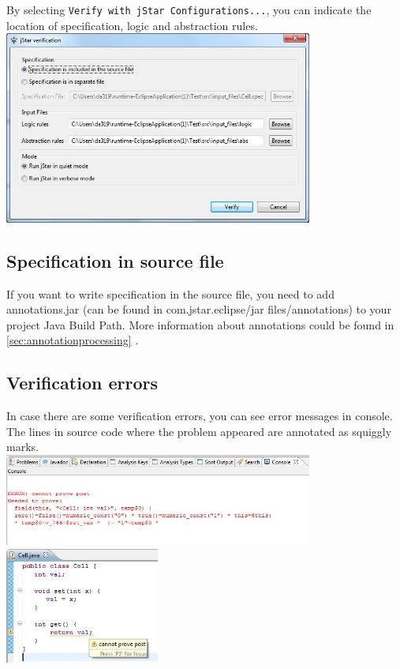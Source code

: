 \documentclass{article}
\begin{document}
By selecting \texttt{Verify with jStar Configurations...}, you can indicate the location of specification, logic and abstraction rules.\\

\includegraphics[width=4in]{images/verificationWindow.jpg}

\subsection*{Specification in source file}

If you want to write specification in the source file, you need to add annotations.jar (can be found in com.jstar.eclipse/jar files/annotations) to your project Java Build Path. More information about annotations could be found in \ref{sec:annotationprocessing} .

\subsection* {Verification errors}

In case there are some verification errors, you can see error messages in console. The lines in source code where the problem appeared are annotated as squiggly marks.\\

\includegraphics[width=4in]{images/console.jpg}\\

\includegraphics[width=2in]{images/marker.jpg}
\end{document}
